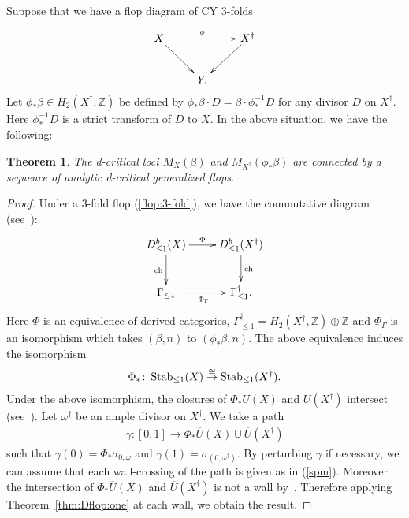 \documentclass[11pt]{amsart}
\theoremstyle{plain}
\newtheorem{thm}{Theorem}[section]
\theoremstyle{definition}
\theoremstyle{remark}
\newcommand{\ch}{\mathop{\rm ch}\nolimits}
\newcommand{\Stab}{\mathop{\rm Stab}\nolimits}
\begin{document}
Suppose that we have a flop diagram of 
CY 3-folds
\begin{align}\label{flop:3-fold}
\xymatrix{
X \ar[rd]\ar@{.>}[rr]^-{\phi} & & X^{\dag} \ar[ld] \\
& Y. &
}
\end{align}
Let $\phi_{\ast}\beta \in H_2(X^{\dag}, \mathbb{Z})$
be defined by 
$\phi_{\ast} \beta \cdot D=\beta \cdot \phi_{\ast}^{-1}D$
for any divisor $D$ on $X^{\dag}$. Here 
$\phi_{\ast}^{-1}D$ is a strict transform of $D$ to $X$. 
In the above situation, we have the following:
\begin{thm}\label{thm:FF}
The d-critical loci 
$M_{X}(\beta)$ and $M_{X^{\dag}}(\phi_{\ast}\beta)$
are connected by a sequence of analytic 
d-critical 
generalized flops. 
\end{thm}
\begin{proof}
Under a 3-fold flop (\ref{flop:3-fold}),
we have the commutative diagram
(see~\cite{Br1, ToBPS}):
\begin{align*}
\xymatrix{
D^b_{\le 1}(X) \ar[r]^-{\Phi} \ar[d]_-{\ch} & D^b_{\le 1}(X^{\dag}) \ar[d]^-{\ch} \\
\Gamma_{\le 1} \ar[r]_{\Phi_{\Gamma}} & \Gamma_{\le 1}^{\dag}.
}
\end{align*}
Here 
$\Phi$ is an equivalence of derived categories, 
$\Gamma_{\le 1}^{\dag}=H_2(X^{\dag}, \mathbb{Z})
\oplus \mathbb{Z}$
and 
$\Phi_{\Gamma}$ is an isomorphism 
which takes 
$(\beta, n)$ to $(\phi_{\ast}\beta, n)$. 
The above equivalence induces 
the isomorphism
\begin{align*}
\Phi_{\ast} \colon 
\Stab_{\le 1}(X) \stackrel{\cong}{\to} 
\Stab_{\le 1}(X^{\dag}).
\end{align*}
Under the above isomorphism, 
the closures of $\Phi_{\ast}U(X)$
and $U(X^{\dag})$ intersect
(see~\cite[Lemma~6.4]{TodGV}).
Let $\omega^{\dag}$ be an ample 
divisor on $X^{\dag}$. 
We take a
path 
\begin{align*}
\gamma \colon 
[0, 1]
\to 
\Phi_{\ast}\overline{U}(X) \cup 
\overline{U}(X^{\dag})
\end{align*}
such that 
$\gamma(0)=
\Phi_{\ast}\sigma_{0, \omega}$
and $\gamma(1)=\sigma_{(0, \omega^{\dag})}$. 
By perturbing $\gamma$ if necessary, 
we can assume that 
each wall-crossing of the path is given 
as in (\ref{spm}). 
Moreover the intersection of 
$\Phi_{\ast}\overline{U}(X)$
and $\overline{U}(X^{\dag})$ is 
not a wall by~\cite[Lemma~6.7]{TodGV}. 
Therefore applying Theorem~\ref{thm:Dflop:one}
at each wall, we obtain the 
result. 
\end{proof}
\end{document}
